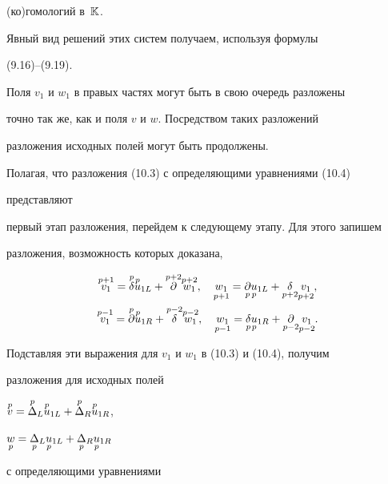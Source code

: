 (ко)гомологий в~$\Bbb K$.


Явный вид решений этих систем получаем, используя формулы 


(9.16)--(9.19). 


 


Поля $v_1$ и $w_1$ в правых частях могут быть в свою очередь разложены 


точно так же, как и поля $v$ и $w$. Посредством таких разложений 


разложения исходных полей могут быть продолжены. 


 


Полагая, что разложения (10.3) с определяющими уравнениями (10.4) 


представляют  


первый этап разложения, перейдем к следующему этапу. Для этого запишем 


разложения, возможность которых доказана, 


\begin{gather*} 


\up{p+1}{v_1}=\up{p}{\delta}\up{p}{u}_{1L}+ 


\up{p+2}{\partial}\up{p+2}{w_1},\quad 


\down{p+1}{w_1}=\down{p}{\partial}\down{p}{u}_{1L}+ 


\down{p+2}{\delta}\down{p+2}{v_1}, \\ 


\up{p-1}{v_1}=\up{p}{\partial}\up{p}{u}_{1R}+ 


\up{p-2}{\delta}\up{p-2}{w_1},\quad 


\down{p-1}{w_1}=\down{p}{\delta}\down{p}{u}_{1R}+ 


\down{p-2}{\partial}\down{p-2}{v_1}. 


\end{gather*} 


Подставляя эти выражения для $v_1$ и $w_1$ в (10.3) и (10.4), получим 


разложения для исходных полей 


$\up{p}{v}=\up{p}{\Delta}_L\up{p}{u}_{1L}+ 


\up{p}{\Delta}_R\up{p}{u}_{1R}$,


$\down{p}{w}=\down{p}{\Delta}_L\down{p}{u}_{1L}+ 


\down{p}{\Delta}_R\down{p}{u}_{1R}$ 


с определяющими уравнениями 


$$ 


